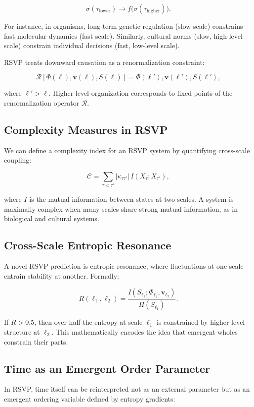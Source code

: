 \documentclass[12pt]{book}
\begin{document}
\[ \sigma(\tau_{\text{lower}}) \to f\big(\sigma(\tau_{\text{higher}})\big). \]

For instance, in organisms, long-term genetic regulation (slow scale) constrains fast molecular dynamics (fast scale). Similarly, cultural norms (slow, high-level scale) constrain individual decisions (fast, low-level scale).

RSVP treats downward causation as a renormalization constraint:

\[ \mathcal{R}[\Phi(\ell), \mathbf{v}(\ell), S(\ell)] = \Phi(\ell'), \mathbf{v}(\ell'), S(\ell'), \]

where \( \ell' > \ell \). Higher-level organization corresponds to fixed points of the renormalization operator \( \mathcal{R} \).

\subsection{Complexity Measures in RSVP}
We can define a complexity index for an RSVP system by quantifying cross-scale coupling:

\[ \mathcal{C} = \sum_{\tau < \tau'} |\kappa_{\tau \tau'}| \, I(X_\tau; X_{\tau'}), \]

where \( I \) is the mutual information between states at two scales. A system is maximally complex when many scales share strong mutual information, as in biological and cultural systems.

\subsection{Cross-Scale Entropic Resonance}
A novel RSVP prediction is entropic resonance, where fluctuations at one scale entrain stability at another. Formally:

\[ R(\ell_1, \ell_2) = \frac{I(S_{\ell_1}; \Phi_{\ell_2}, \mathbf{v}_{\ell_2})}{H(S_{\ell_1})}. \]

If \( R > 0.5 \), then over half the entropy at scale \( \ell_1 \) is constrained by higher-level structure at \( \ell_2 \). This mathematically encodes the idea that emergent wholes constrain their parts.

\subsection{Time as an Emergent Order Parameter}
In RSVP, time itself can be reinterpreted not as an external parameter but as an emergent ordering variable defined by entropy gradients:
\end{document}
